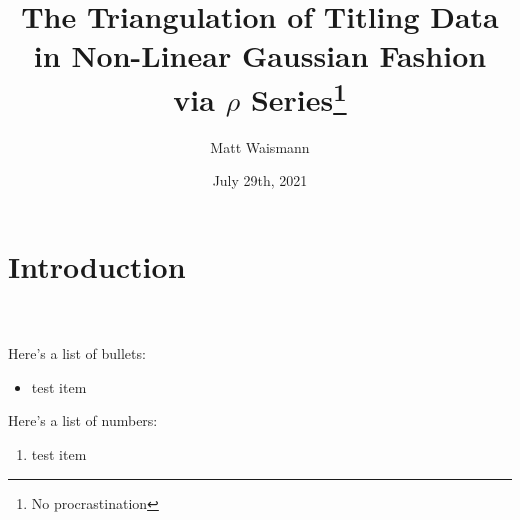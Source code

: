 \documentclass{article}%
\title{The Triangulation of Titling Data in Non-Linear Gaussian Fashion via $\rho$ Series\thanks{No procrastination}}
\date{July 29th, 2021}
\author{Matt Waismann}
\begin{document}
\maketitle
\section{Introduction}
\blindtext \\ \\
Here's a list of bullets:
\begin{itemize}
    \item test item
\end{itemize}
Here's a list of numbers:
\begin{enumerate}
    \item test item
\end{enumerate}
\end{document}
